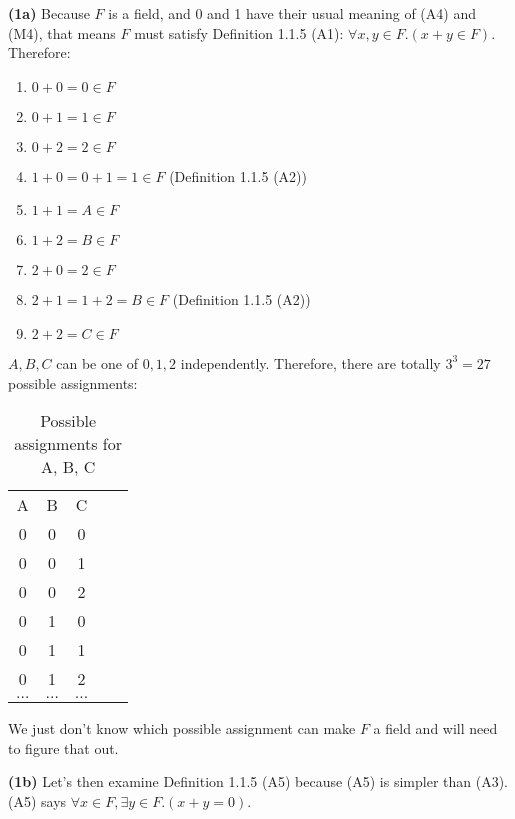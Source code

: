 \documentclass[12pt, letterpaper, oneside]{book}
\begin{document}
\textbf{(1a)} Because $F$ is a field, and 0 and 1 have their usual meaning of (A4) and (M4), that means $F$ must satisfy Definition
1.1.5 (A1): $\forall x, y \in F. (x + y \in F)$. Therefore:
\begin{enumerate}
  \item $0 + 0 = 0 \in F$
  \item $0 + 1 = 1 \in F$
  \item $0 + 2 = 2 \in F$
  \item $1 + 0 = 0 + 1 = 1 \in F$ (Definition 1.1.5 (A2))
  \item $1 + 1 = A \in F$
  \item $1 + 2 = B \in F$
  \item $2 + 0 = 2 \in F$
  \item $2 + 1 = 1 + 2 = B \in F$ (Definition 1.1.5 (A2))
  \item $2 + 2 = C \in F$
\end{enumerate}

$A, B, C$ can be one of $0, 1, 2$ independently. Therefore, there are totally $3^3 = 27$ possible assignments:

\begin{table}[H]
  \centering
  \begin{tabular}{|c|c|c|ll}
    \cline{1-3}
    A        & B        & C        &  & \\ [1ex] \cline{1-3}
    0        & 0        & 0        &  & \\ [0.5ex] \cline{1-3}
    0        & 0        & 1        &  & \\ [0.5ex] \cline{1-3}
    0        & 0        & 2        &  & \\ [0.5ex] \cline{1-3}
    0        & 1        & 0        &  & \\ [0.5ex] \cline{1-3}
    0        & 1        & 1        &  & \\ [0.5ex] \cline{1-3}
    0        & 1        & 2        &  & \\ [0.5ex] \cline{1-3}
    $\ldots$ & $\ldots$ & $\ldots$ &  & \\ [0.5ex] \cline{1-3}
  \end{tabular}
  \caption{Possible assignments for A, B, C}
  \label{table:1.1.8-1a}
\end{table}

We just don't know which possible assignment can make $F$ a field and will need to figure that out.

\textbf{(1b)} Let's then examine Definition 1.1.5 (A5) because (A5) is simpler than (A3). (A5) says $\forall x \in F,
  \exists y \in F. (x + y = 0)$.
\end{document}
